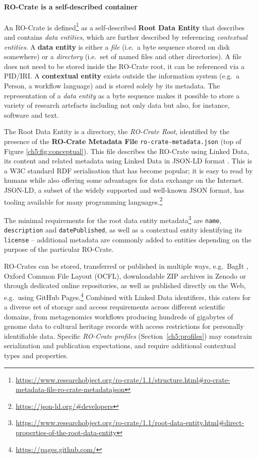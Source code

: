 \paragraph{RO-Crate is a self-described container}\label{ch5:selfdescribed}

An RO-Crate is defined\footnote{\url{https://www.researchobject.org/ro-crate/1.1/structure.html\#ro-crate-metadata-file-ro-crate-metadatajson}} as a self-described \textbf{Root Data Entity} that describes
and contains \emph{data entities}, which are further described by
referencing \emph{contextual entities}. A \textbf{data entity} is either
a \emph{file} (i.e.~a byte sequence stored on disk somewhere) or a
\emph{directory} (i.e.~set of named files and other directories). A file
does not need to be stored inside the RO-Crate root, it can be
referenced via a PID/IRI. A \textbf{contextual entity} exists outside
the information system (e.g.~a Person, a workflow language) and is
stored solely by its metadata. The representation of a \emph{data
entity} as a byte sequence makes it possible to store a variety of
research artefacts including not only data but also, for instance,
software and text.


The Root Data Entity is a directory, the \emph{RO-Crate Root},
identified by the presence of the \textbf{RO-Crate Metadata File}
\texttt{ro-crate-metadata.json} (top of Figure \vref{ch5:fig:conceptual}). This file describes the
RO-Crate using Linked Data, its content and related metadata using
Linked Data in JSON-LD format \cite{w3-ldp}. This
is a W3C standard RDF serialisation that has become popular; it is easy
to read by humans while also offering some advantages for data exchange
on the Internet. JSON-LD, a subset of the widely supported and
well-known JSON format, has tooling available for many programming languages.\footnote{\url{https://json-ld.org/\#developers}}

The minimal requirements for the root data entity
metadata\footnote{\url{https://www.researchobject.org/ro-crate/1.1/root-data-entity.html\#direct-properties-of-the-root-data-entity}}
are \texttt{name}, \texttt{description} and \texttt{datePublished}, as well as a contextual
entity identifying its \texttt{license} -- additional metadata are commonly
added to entities depending on the purpose of the particular RO-Crate.

RO-Crates can be stored, transferred or published in multiple ways,
e.g.~BagIt \cite{ch5-74}, Oxford
Common File Layout \cite{ch5-96} (OCFL),
downloadable ZIP archives in Zenodo or through dedicated online
repositories, as well as published directly on the Web, e.g.~using
GitHub Pages.\footnote{\url{https://pages.github.com/}} Combined with Linked Data identifiers, this caters for a diverse set of storage and access
requirements across different scientific domains, from metagenomics
workflows producing hundreds of gigabytes of genome data to cultural
heritage records with access restrictions for personally identifiable
data. Specific \emph{RO-Crate profiles} (Section~\vref{ch5:profiles}) may constrain serialization
and publication expectations, and require additional contextual types
and properties.

